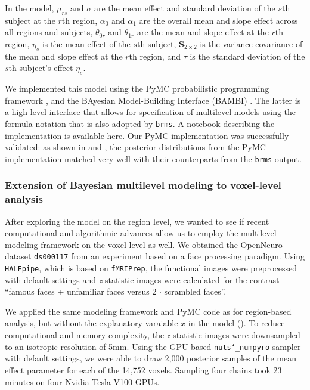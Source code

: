 \documentclass[../main.tex]{subfiles}
\begin{document}
\noindent
In the model, $\mu_{rs}$ and $\sigma$ are the mean effect and standard deviation of the $s$th subject at the $r$th region, $\alpha_0$ and $\alpha_1$ are the overall mean and slope effect across all regions and subjects, $\theta_{0r}$ and $\theta_{1r}$ are the mean and slope effect at the $r$th region, $\eta_s$ is the mean effect of the $s$th subject, $\boldsymbol{S}_{2\times 2}$ is the variance-covariance of the mean and slope effect at the $r$th region, and $\tau$ is the standard deviation of the $s$th subject's effect $\eta_s$.%

We implemented this model using the PyMC probabilistic programming framework \supercite{Salvatier2016}, and the BAyesian Model-Building Interface (BAMBI) \supercite{capretto2020}. The latter is a high-level interface that allows for specification of multilevel models using the formula notation that is also adopted by \texttt{brms}. A notebook describing the implementation is available \href{https://github.com/crnolan/pyrba}{here}. Our PyMC implementation was successfully validated: as shown in  and ,  the posterior distributions from the PyMC implementation matched very well with their counterparts from the \texttt{brms} output.%

\subsubsection{Extension of Bayesian multilevel modeling to voxel-level analysis}

After exploring the model on the region level, we wanted to see if recent computational and algorithmic advances allow us to employ the multilevel modeling framework on the voxel level as well. We obtained the OpenNeuro dataset \texttt{ds000117}\supercite{wakeman_multi-subject_2015} from an experiment based on  a face processing paradigm. Using \texttt{HALFpipe}\supercite{waller_enigma_2022}, which is based on \texttt{fMRIPrep}\supercite{esteban_fmriprep_2019}, the functional images were preprocessed with default settings and \emph{z}-statistic images were calculated for the contrast ``famous faces + unfamiliar faces versus 2 $\cdot$ scrambled faces''. 

We applied the same modeling framework and PyMC code as for region-based analysis, but without the explanatory varaiable $x$ in the model (). To reduce computational and memory complexity, the \emph{z}-statistic images were downsampled to an isotropic resolution of 5mm. Using the GPU-based \texttt{nuts\char`_numpyro} sampler\supercite{phan_composable_2019} with default settings, we were able to draw 2,000 posterior samples of the mean effect parameter for each of the 14,752 voxels. Sampling four chains took 23 minutes on four Nvidia Tesla V100 GPUs.
\end{document}
